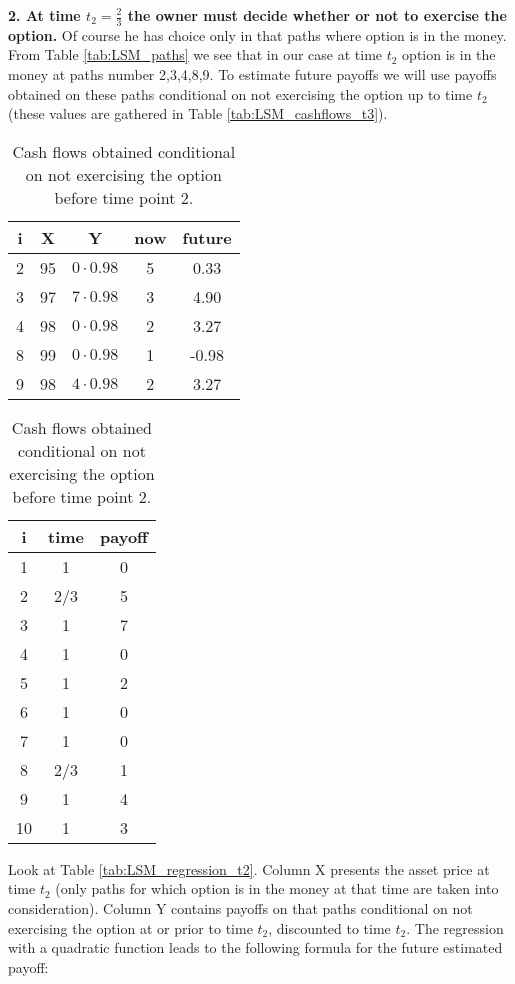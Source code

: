 \documentclass[a4paper,11pt, twoside]{book}
\theoremstyle{definition}
\theoremstyle{remark}
\begin{document}
\FloatBarrier
\noindent \textbf{2. At time $t_2 = \frac{2}{3}$ the owner must decide whether or not to exercise the option.} Of course he has choice only in that paths where option is in the money. From Table \ref{tab:LSM_paths} we see that in our case at time $t_2$ option is in the money at paths number 2,3,4,8,9. To estimate future payoffs we will use payoffs obtained on these paths conditional on not exercising the option up to time $t_2$ (these values are gathered in Table \ref{tab:LSM_cashflows_t3}).

\begin{table}[!ht]
\parbox{.45\linewidth} {
  \centering
  \caption{Estimating future payoffs at time point 2.}
  \label{tab:LSM_regression_t2}
  \begin{tabular} {||c |c |c || c | c ||}  
  \hline 
    i & X   &  Y  & now   &  future\\ \hline \hline
    2 & 95 & $0\cdot 0.98$ & 5 & 0.33 \\ \hline
    3 & 97 & $7\cdot 0.98$ & 3 & 4.90  \\ \hline
    4 & 98 & $0\cdot 0.98$ & 2 & 3.27 \\ \hline
    8 & 99 & $0\cdot 0.98$ & 1 & -0.98 \\ \hline
    9 & 98 & $4\cdot 0.98$ & 2 & 3.27 \\ \hline
  \end{tabular}
}
\qquad
\parbox{.45\linewidth} {
  \centering
  \caption{Cash flows obtained conditional on not exercising the option before time point 2.}
  \label{tab:LSM_cashflows_t2}
  \begin{tabular}{||c|c|c||}
  \hline 
  i  & time  &  payoff \\ \hline \hline
  1  & 1     &      0 \\ \hline
  2  & 2/3   &      5 \\ \hline
  3  & 1     &      7 \\ \hline
  4  & 1     &      0 \\ \hline
  5  & 1     &      2 \\ \hline
  6  & 1     &      0 \\ \hline
  7  & 1     &      0 \\ \hline
  8  & 2/3   &      1 \\ \hline
  9  & 1     &      4 \\ \hline
  10  & 1     &      3 \\ \hline
  \end{tabular}
}
\end{table}
Look at Table \ref{tab:LSM_regression_t2}. Column X presents the asset price at time $t_2$ (only paths for which option is in the money at that time are taken into consideration). Column Y contains payoffs on that paths conditional on not exercising the option at or prior to time $t_2$, discounted to time $t_2$. The regression with a quadratic function leads to the following formula for the future estimated payoff:
\end{document}
